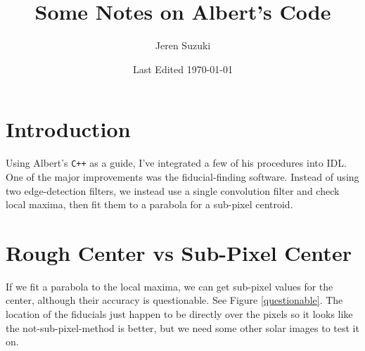 \documentclass[10pt]{scrartcl}
\title{Some Notes on Albert's Code}
\author{Jeren Suzuki}
\date{Last Edited \today}
\begin{document}
\maketitle
{}
\tableofcontents
\clearpage
{}

\section{Introduction} %
\label{sec:introduction}
Using Albert's \verb!C++! as a guide, I've integrated a few of his procedures into IDL. One of the major improvements was the fiducial-finding software. Instead of using two edge-detection filters, we instead use a single convolution filter and check local maxima, then fit them to a parabola for a sub-pixel centroid. 

\section{Rough Center vs Sub-Pixel Center} %
\label{sec:rough_center_vs_sub_pixel_center}
If we fit a parabola to the local maxima, we can get sub-pixel values for the center, although their accuracy is questionable. See Figure \ref{questionable}. The location of the fiducials just happen to be directly over the pixels so it looks like the not-sub-pixel-method is better, but we need some other solar images to test it on. 

\end{document}
